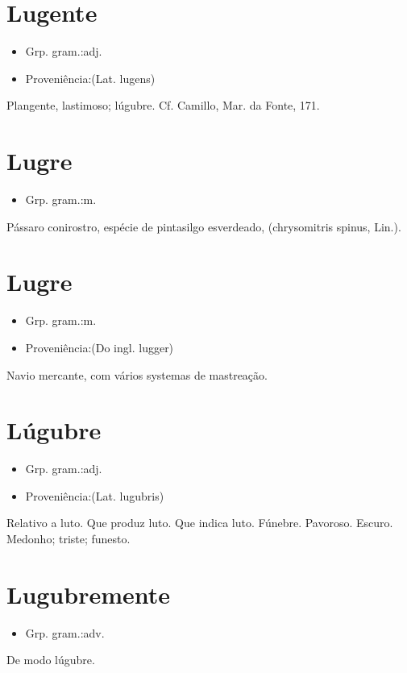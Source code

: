 \section{Lugente}
\begin{itemize}
\item {Grp. gram.:adj.}
\end{itemize}
\begin{itemize}
\item {Proveniência:(Lat. \textunderscore lugens\textunderscore )}
\end{itemize}
Plangente, lastimoso; lúgubre. Cf. Camillo, \textunderscore Mar. da Fonte\textunderscore , 171.
\section{Lugre}
\begin{itemize}
\item {Grp. gram.:m.}
\end{itemize}
Pássaro conirostro, espécie de pintasilgo esverdeado, (\textunderscore chrysomitris spinus\textunderscore , Lin.).
\section{Lugre}
\begin{itemize}
\item {Grp. gram.:m.}
\end{itemize}
\begin{itemize}
\item {Proveniência:(Do ingl. \textunderscore lugger\textunderscore )}
\end{itemize}
Navio mercante, com vários systemas de mastreação.
\section{Lúgubre}
\begin{itemize}
\item {Grp. gram.:adj.}
\end{itemize}
\begin{itemize}
\item {Proveniência:(Lat. \textunderscore lugubris\textunderscore )}
\end{itemize}
Relativo a luto.
Que produz luto.
Que indica luto.
Fúnebre.
Pavoroso.
Escuro.
Medonho; triste; funesto.
\section{Lugubremente}
\begin{itemize}
\item {Grp. gram.:adv.}
\end{itemize}
De modo lúgubre.
